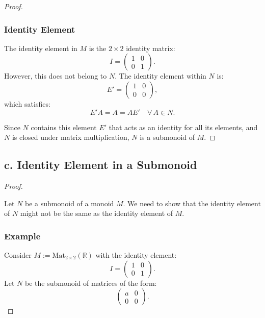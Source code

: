 \documentclass[12pt]{amsart}
\theoremstyle{definition}
\numberwithin{equation}{section}
\newcommand{\R}{\mathbb{R}}
\begin{document}
\begin{exercise}{2}
\begin{proof}
    \subsubsection*{Identity Element}
    
    The identity element in \(M\) is the \(2 \times 2\) identity matrix:
    \[
    I = \begin{pmatrix}
    1 & 0 \\
    0 & 1
    \end{pmatrix}.
    \]
    However, this does not belong to \(N\). The identity element within \(N\) is:
    \[
    E' = \begin{pmatrix}
    1 & 0 \\
    0 & 0
    \end{pmatrix},
    \]
    which satisfies:
    \[
    E'A = A = AE' \quad \forall \, A \in N.
    \]
    
    Since \(N\) contains this element \(E'\) that acts as an identity for all its elements, and \(N\) is closed under matrix multiplication, \(N\) is a submonoid of \(M\).
    
    \end{proof}
    
    \subsection*{\textbf{c. Identity Element in a Submonoid}}
    
    \begin{proof} \( \)
    
    Let \(N\) be a submonoid of a monoid \(M\). We need to show that the identity element of \(N\) might not be the same as the identity element of \(M\).
    
    \subsubsection*{Example}
    
    Consider \(M := \text{Mat}_{2 \times 2}(\R)\) with the identity element:
    \[
    I = \begin{pmatrix}
    1 & 0 \\
    0 & 1
    \end{pmatrix}.
    \]
    Let \(N\) be the submonoid of matrices of the form:
    \[
    \begin{pmatrix}
    a & 0 \\
    0 & 0
    \end{pmatrix}.
    \]
    

\end{proof}
\end{exercise}
\end{document}
